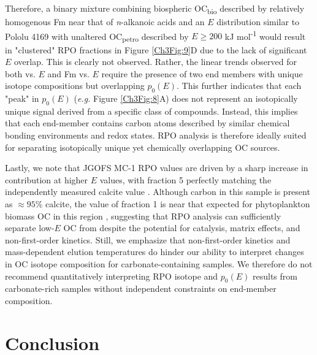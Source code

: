 Therefore, a binary mixture combining biospheric OC\textsubscript{bio} described by relatively homogenous Fm near that of \textit{n}-alkanoic acids and an $E$ distribution similar to Pololu 4169 with unaltered OC\textsubscript{petro} described by $E \geq 200$ kJ mol\textsuperscript{-1} would result in "clustered" RPO fractions in Figure \ref{Ch3Fig:9}D due to the lack of significant $E$ overlap. This is clearly not observed. Rather, the linear trends observed for both  vs. $E$ and Fm vs. $E$ require the presence of two end members with unique isotope compositions but overlapping $p_{0}(E)$. This further indicates that each "peak" in $p_{0}(E)$ (\textit{e.g.} Figure \ref{Ch3Fig:8}A) does not represent an isotopically unique signal derived from a specific class of compounds. Instead, this implies that each end-member contains carbon atoms described by similar chemical bonding environments and redox states. RPO analysis is therefore ideally suited for separating isotopically unique yet chemically overlapping OC sources.

Lastly, we note that JGOFS MC-1 RPO  values are driven by a sharp increase in  contribution at higher $E$ values, with fraction 5 perfectly matching the independently measured calcite value \citep[Figure \ref{Ch3Fig:9}E;][]{Sayles:2001ua}. Although carbon in this sample is present as $\approx 95$\% calcite, the  value of fraction 1 is near that expected for phytoplankton biomass OC in this region \citep{Rau:1989wr}, suggesting that RPO analysis can sufficiently separate low-$E$ OC from  despite the potential for catalysis, matrix effects, and non-first-order kinetics. Still, we emphasize that non-first-order kinetics and mass-dependent  elution temperatures do hinder our ability to interpret changes in OC isotope composition for carbonate-containing samples. We therefore do not recommend quantitatively interpreting RPO isotope and $p_{0}(E)$ results from carbonate-rich samples without independent constraints on end-member composition. 

\section{Conclusion}


